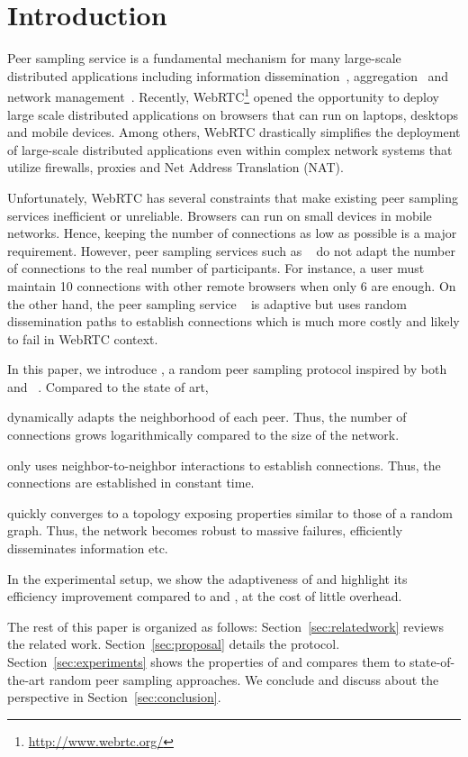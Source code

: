 
\section{Introduction}

Peer sampling service is a fundamental mechanism for many large-scale
distributed applications including information
dissemination~\cite{eugster2003lightweight, tolgyeski2009adaptive},
aggregation~\cite{jelasity2004epidemic} and network
management~\cite{jelasity2009tman, voulgaris2005epidemic}. Recently,
WebRTC\footnote{\url{http://www.webrtc.org/}} opened the opportunity to deploy
large scale distributed applications on browsers that can run on laptops,
desktops and mobile devices. Among others, WebRTC drastically simplifies the
deployment of large-scale distributed applications even within complex network
systems that utilize firewalls, proxies and Net Address Translation (NAT).

Unfortunately, WebRTC has several constraints that make existing peer sampling
services inefficient or unreliable. Brow\-sers can run on small devices in
mobile networks. Hence, keeping the number of connections as low as possible is
a major requirement. However, peer sampling services such as
\CYCLON~\cite{voulgaris2005cyclon} do not adapt the number of connections to
the real number of participants. For instance, a user must maintain 10
connections with other remote browsers when only 6 are enough. On the other
hand, the peer sampling service \SCAMP~\cite{ganesh2003peer} is adaptive but
uses random dissemination paths to establish connections which is much more
costly and likely to fail in WebRTC context.

In this paper, we introduce \SPRAY, a random peer sampling protocol inspired by
both \SCAMP~\cite{ganesh2003peer}
and \CYCLON~\cite{voulgaris2005cyclon}. Compared to the state of art,
\begin{inparaenum}[(i)]
\item \SPRAY dynamically adapts the neighborhood of each peer. Thus, the number
  of connections grows logarithmically compared to the size of the network.
\item \SPRAY only uses neighbor-to-neighbor interactions to establish
  connections. Thus, the connections are established in constant time.
\item \SPRAY quickly converges to a topology exposing properties similar to
  those of a random graph. Thus, the network becomes robust to massive
  failures, efficiently disseminates information etc.
\item In the experimental setup, we show the adaptiveness of \SPRAY and
  highlight its efficiency improvement compared to \CYCLON and \SCAMP, at the
  cost of little overhead.
\end{inparaenum}

The rest of this paper is organized as follows: Section~\ref{sec:relatedwork}
reviews the related work. Section~\ref{sec:proposal}
details the \SPRAY protocol. Section~\ref{sec:experiments} shows the properties
of \SPRAY and compares them to state-of-the-art random peer sampling
approaches. We conclude and discuss about the perspective in
Section~\ref{sec:conclusion}.

